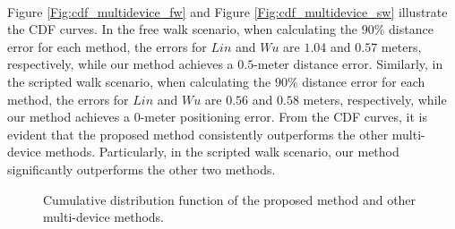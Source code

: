 \documentclass[a4paper,12pt]{report}
\begin{document}
\paragraph{}
Figure \ref{Fig:cdf_multidevice_fw} and Figure \ref{Fig:cdf_multidevice_sw} illustrate the CDF curves. In the free walk scenario, when calculating the $90\%$ distance error for each method, the errors for $Lin$ and $Wu$ are $1.04$ and $0.57$ meters, respectively, while our method achieves a $0.5$-meter distance error. Similarly, in the scripted walk scenario, when calculating the $90\%$ distance error for each method, the errors for $Lin$ and $Wu$  are $0.56$ and $0.58$ meters, respectively, while our method achieves a $0$-meter positioning error. From the CDF curves, it is evident that the proposed method consistently outperforms the other multi-device methods. Particularly, in the scripted walk scenario, our method significantly outperforms the other two methods.
\begin{figure}[htbp]
    \centering
    
    \caption{Cumulative distribution function of the proposed method and other multi-device methods.}
    \label{Fig:cdf_multidevice}
\end{figure}
\end{document}
